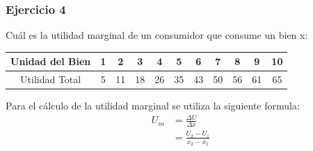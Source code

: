 \documentclass{templateNote}
\begin{document}
\newpage
\subsubsection{Ejercicio 4}
\indent
Cuál es la utilidad marginal de un consumidor que consume un bien x:

\begin{table}[H]
    \centering
    \begin{tabular}{|c|c|c|c|c|c|c|c|c|c|c|}
        \hline
        Unidad del Bien & 1 & 2 & 3 & 4 & 5 & 6 & 7 & 8 & 9 & 10 \\
        \hline
        Utilidad Total & 5 & 11 & 18 & 26 & 35 & 43 & 50 & 56 & 61 & 65\\
        \hline
    \end{tabular}
\end{table}

Para el cálculo de la utilidad marginal se utiliza la siguiente formula:
\begin{align*}
    U_m &= \frac{\Delta U}{\Delta x} \\
    &= \frac{U_2 - U_1}{x_2 - x_1}
\end{align*}
\end{document}
